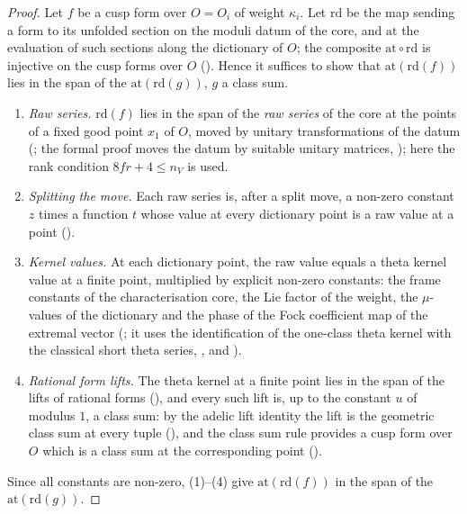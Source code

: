 \begin{proof}
Let $f$ be a cusp form over $O=O_i$ of weight $\kappa_i$. Let $\mathrm{rd}$ be the map sending a form to its unfolded section on the
moduli datum of the core, and $\mathrm{at}$ the evaluation of such sections along the dictionary of $O$; the composite
$\mathrm{at}\circ\mathrm{rd}$ is injective on the cusp forms over $O$ ().
Hence it suffices to show that $\mathrm{at}(\mathrm{rd}(f))$ lies in the span of the $\mathrm{at}(\mathrm{rd}(g))$, $g$ a class sum.
\begin{enumerate}[label=(\arabic*)]
\item \emph{Raw series.} $\mathrm{rd}(f)$ lies in the span of the \emph{raw series} of the core at the points of a fixed good point $x_1$
of $O$, moved by unitary transformations of the datum (; the formal proof moves
the datum by suitable unitary matrices, ); here the rank condition $8fr+4\le n_V$
is used.
\item \emph{Splitting the move.} Each raw series is, after a split move, a non-zero constant $z$ times a function $t$ whose value at
every dictionary point is a raw value at a point ().
\item \emph{Kernel values.} At each dictionary point, the raw value equals a theta kernel value at a finite point, multiplied by
explicit non-zero constants: the frame constants of the characterisation core, the Lie factor of the weight, the $\mu$-values of the
dictionary and the phase of the Fock coefficient map of the extremal vector
(; it uses the identification of the one-class theta kernel with the
classical short theta series, , and
).
\item \emph{Rational form lifts.} The theta kernel at a finite point lies in the span of the lifts of rational forms
(), and every such lift is, up to the constant
$u$ of modulus $1$, a class sum: by the adelic lift identity the lift is the geometric class sum at every tuple
(), and the class sum rule provides a cusp form over $O$
which is a class sum at the corresponding point ().
\end{enumerate}
Since all constants are non-zero, (1)--(4) give $\mathrm{at}(\mathrm{rd}(f))$ in the span of the $\mathrm{at}(\mathrm{rd}(g))$.
\end{proof}

